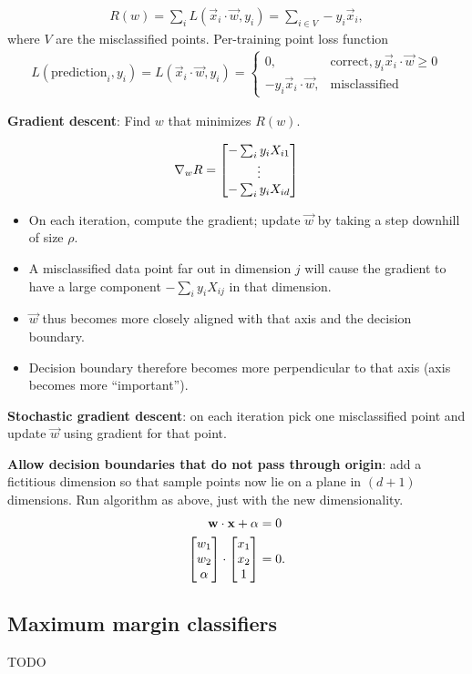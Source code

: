 \documentclass[12pt]{article}
\newcommand{\x}{\vec x}
\newcommand{\w}{\vec w}
\begin{document}
\begin{align*}
  R(w) = \sum_i L(\x_i \cdot \w, y_i) = \sum_{i \in V} -y_i\x_i,
\end{align*}
where $V$ are the misclassified points. Per-training point loss function
\begin{align*}
  L(\text{prediction}_i, y_i) = L(\x_i \cdot \w, y_i) =
  \begin{cases}
    0, &\text{correct}, y_i\x_i \cdot \w \geq 0\\
    -y_i\x_i \cdot \w, &\text{misclassified}
  \end{cases}
\end{align*}


\textbf{Gradient descent}: Find $w$ that minimizes $R(w)$.


\begin{align*}
  \nabla_w R = \begin{bmatrix}-\sum_i y_iX_{i1}\\\vdots\\-\sum_i y_iX_{id}\end{bmatrix}
\end{align*}
\begin{itemize}
\item On each iteration, compute the gradient; update $\w$ by taking a step
  downhill of size $\rho$.
\item A misclassified data point far out in dimension $j$ will cause the
  gradient to have a large component $-\sum_i y_iX_{ij}$ in that dimension.
\item $\w$ thus becomes more closely aligned with that axis and the decision
  boundary.
\item Decision boundary therefore becomes more perpendicular to that axis (axis
  becomes more ``important'').
\end{itemize}

\textbf{Stochastic gradient descent}: on each iteration pick one misclassified
point and update $\w$ using gradient for that point.

\textbf{Allow decision boundaries that do not pass through origin}: add a
fictitious dimension so that sample points now lie on a plane in $(d+1)$
dimensions. Run algorithm as above, just with the new dimensionality.
\begin{align*}
  \w \cdot \x + \alpha &= 0 \\
  \cveccc{w_1}
         {w_2}
         {\alpha} \cdot \cveccc{x_1}{x_2}{1} &= 0.
\end{align*}

\subsection*{Maximum margin classifiers}
TODO
\end{document}
